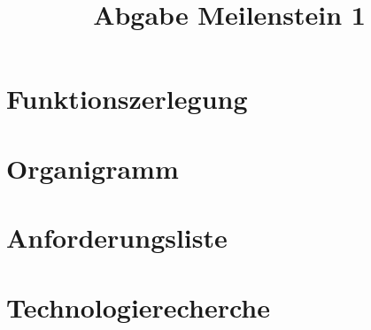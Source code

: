 \documentclass{scrartcl}                %
\begin{document}
\title{Abgabe Meilenstein 1}
\maketitle

\tableofcontents
\newpage


\newpage

\section{Funktionszerlegung}

\newpage
\section{Organigramm}

\newpage

\section{Anforderungsliste}

\newpage

\section{Technologierecherche}

\newpage


\newpage
\end{document}
